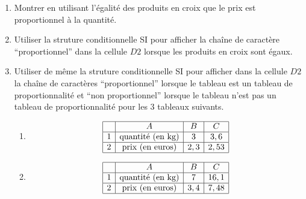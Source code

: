 \documentclass{article}
\begin{document}
\begin{enumerate}[leftmargin=0cm,itemindent=.5cm,labelwidth=\itemindent,labelsep=0cm,align=left,label=\arabic*)]

\item Montrer en utilisant l'égalité des produits en croix que le prix est proportionnel à la quantité.
  
\item Utiliser la struture conditionnelle SI pour afficher la chaîne de caractère ``proportionnel'' dans la cellule $D2$ lorsque les produits en croix sont égaux.


\item Utiliser de même la struture conditionnelle SI pour afficher dans la cellule $D2$
  la chaîne de caractères ``proportionnel''  lorsque le tableau est un tableau de proportionnalité
  et ``non proportionnel'' lorsque le tableau n'est pas un tableau de proportionnalité pour les $3$ tableaux suivants.


  \begin{enumerate}[leftmargin=0cm,itemindent=.5cm,labelwidth=\itemindent,labelsep=0cm,align=left,label=\alph*)]
    
  \item 
    \begin{equation*}
      \begin{array}{|c|c|c|c|}
        \hline
        & A & B & C \\
        \hline
        1 & \textrm{quantité (en kg)} & 3 & 3,6 \\
        \hline
        2 & \textrm{prix (en euros)} & 2,3 & 2,53 \\
        \hline
      \end{array}
    \end{equation*}
    
  \item 
    \begin{equation*}
      \begin{array}{|c|c|c|c|}
        \hline
        & A & B & C \\
        \hline
        1 & \textrm{quantité (en kg)} & 7 & 16,1 \\
        \hline
        2 & \textrm{prix (en euros)} & 3,4 & 7,48 \\
        \hline
      \end{array}
    \end{equation*}
    

\end{enumerate}
\end{enumerate}
\end{document}
